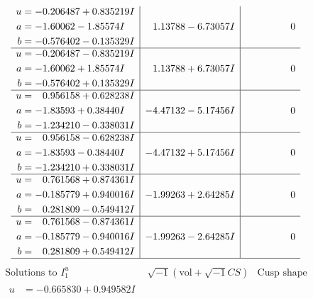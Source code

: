 \documentclass[1p]{elsarticle_modified}
\theoremstyle{definition}
\newcommand{\I}{\sqrt{-1}}
\begin{document}
$$\begin{array}{c|c|c}
\begin{aligned}
u &= -0.206487 + 0.835219 I \\
a &= -1.60062 - 1.85574 I \\
b &= -0.576402 - 0.135329 I\end{aligned}
 & \phantom{-}1.13788 - 6.73057 I & \phantom{-0.000000 } 0 \\ \hline\begin{aligned}
u &= -0.206487 - 0.835219 I \\
a &= -1.60062 + 1.85574 I \\
b &= -0.576402 + 0.135329 I\end{aligned}
 & \phantom{-}1.13788 + 6.73057 I & \phantom{-0.000000 } 0 \\ \hline\begin{aligned}
u &= \phantom{-}0.956158 + 0.628238 I \\
a &= -1.83593 + 0.38440 I \\
b &= -1.234210 - 0.338031 I\end{aligned}
 & -4.47132 - 5.17456 I & \phantom{-0.000000 } 0 \\ \hline\begin{aligned}
u &= \phantom{-}0.956158 - 0.628238 I \\
a &= -1.83593 - 0.38440 I \\
b &= -1.234210 + 0.338031 I\end{aligned}
 & -4.47132 + 5.17456 I & \phantom{-0.000000 } 0 \\ \hline\begin{aligned}
u &= \phantom{-}0.761568 + 0.874361 I \\
a &= -0.185779 + 0.940016 I \\
b &= \phantom{-}0.281809 - 0.549412 I\end{aligned}
 & -1.99263 + 2.64285 I & \phantom{-0.000000 } 0 \\ \hline\begin{aligned}
u &= \phantom{-}0.761568 - 0.874361 I \\
a &= -0.185779 - 0.940016 I \\
b &= \phantom{-}0.281809 + 0.549412 I\end{aligned}
 & -1.99263 - 2.64285 I & \phantom{-0.000000 } 0\\
 \hline 
 \end{array}$$\newpage$$\begin{array}{c|c|c}  
\text{Solutions to }I^u_{1}& \I (\text{vol} + \sqrt{-1}CS) & \text{Cusp shape}\\
 \hline 
\begin{aligned}
u &= -0.665830 + 0.949582 I \\

\end{aligned}
\end{array}$$
\end{document}
